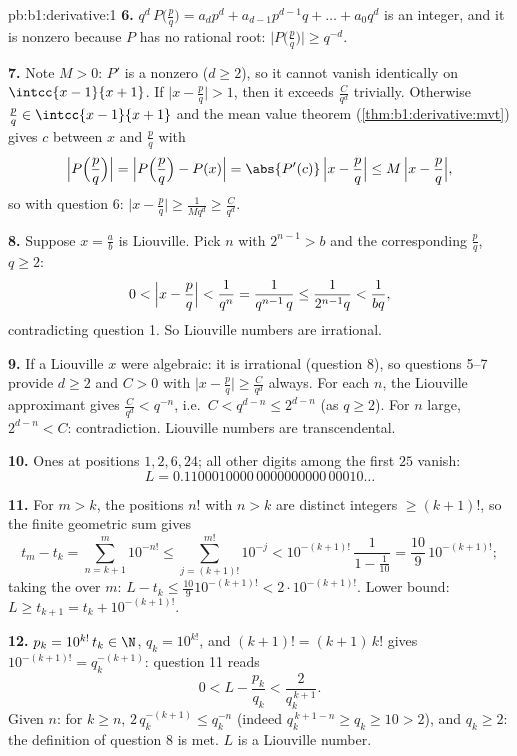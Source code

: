\begin{solution}{pb:b1:derivative:1}
\textbf{6.} $q^d\,P\bigl(\frac pq\bigr) = a_d p^d + a_{d-1}
p^{d-1} q + \dots + a_0 q^d$ is an integer, and it is nonzero
because $P$ has no rational root: $\bigl|P\bigl(\frac
pq\bigr)\bigr| \geq q^{-d}$.

\textbf{7.} Note $M > 0$: $P'$ is a nonzero  ($d \geq
2$), so it cannot vanish identically on
$\intcc{x-1}{x+1}$. If $\bigl|x - \frac pq\bigr| > 1$, then it
exceeds $\frac{C}{q^d}$ trivially. Otherwise $\frac pq \in
\intcc{x-1}{x+1}$ and the mean value theorem
(\cref{thm:b1:derivative:mvt}) gives $c$ between $x$ and
$\frac pq$ with
\[
\Bigl|P\Bigl(\frac pq\Bigr)\Bigr|
= \Bigl|P\Bigl(\frac pq\Bigr) - P(x)\Bigr|
= \abs{P'(c)}\,\Bigl|x - \frac pq\Bigr|
\leq M\,\Bigl|x - \frac pq\Bigr| ,
\]
so with question 6: $\bigl|x - \frac pq\bigr| \geq
\frac{1}{Mq^d} \geq \frac{C}{q^d}$.

\textbf{8.} Suppose $x = \frac ab$ is Liouville. Pick $n$ with
$2^{n-1} > b$ and the corresponding $\frac pq$, $q \geq 2$:
\[
0 < \Bigl|x - \frac pq\Bigr| < \frac{1}{q^n}
= \frac{1}{q^{n-1}\,q} \leq \frac{1}{2^{n-1} q} <
\frac{1}{bq} ,
\]
contradicting question 1. So Liouville numbers are irrational.

\textbf{9.} If a Liouville $x$ were algebraic: it is irrational
(question 8), so questions 5--7 provide $d \geq 2$ and $C > 0$
with $\bigl|x - \frac pq\bigr| \geq \frac{C}{q^d}$ always. For
each $n$, the Liouville approximant gives $\frac{C}{q^d} <
q^{-n}$, i.e.\ $C < q^{d-n} \leq 2^{d-n}$ (as $q \geq 2$). For
$n$ large, $2^{d-n} < C$: contradiction. Liouville numbers are
transcendental.

\textbf{10.} Ones at positions $1, 2, 6, 24$; all other digits
among the first $25$ vanish:
\[
L = 0.1100010000\,0000000000\,00010\dots
\]

\textbf{11.} For $m > k$, the positions $n!$ with $n > k$ are
distinct integers $\geq (k+1)!$, so the finite geometric sum
gives
\[
t_m - t_k = \sum_{n=k+1}^{m} 10^{-n!}
\leq \sum_{j = (k+1)!}^{m!} 10^{-j}
< 10^{-(k+1)!}\,\frac{1}{1 - \frac1{10}}
= \frac{10}{9}\,10^{-(k+1)!} ;
\]
taking the  over $m$: $L - t_k \leq
\frac{10}{9}10^{-(k+1)!} < 2\cdot10^{-(k+1)!}$. Lower bound: $L
\geq t_{k+1} = t_k + 10^{-(k+1)!}$.

\textbf{12.} $p_k = 10^{k!}\,t_k \in \N$, $q_k = 10^{k!}$, and
$(k+1)! = (k+1)\,k!$ gives $10^{-(k+1)!} = q_k^{-(k+1)}$:
question 11 reads
\[
0 < L - \frac{p_k}{q_k} < \frac{2}{q_k^{\,k+1}} .
\]
Given $n$: for $k \geq n$, $2\,q_k^{-(k+1)} \leq q_k^{-n}$
(indeed $q_k^{\,k+1-n} \geq q_k \geq 10 > 2$), and $q_k \geq 2$:
the definition of question 8 is met. $L$ is a Liouville number.


\end{solution}

